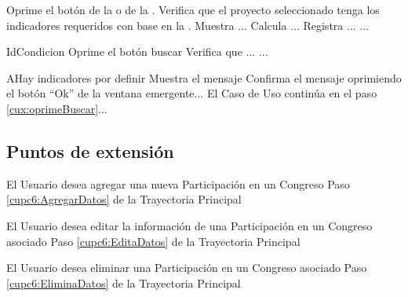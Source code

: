  \begin{UCtrayectoria}
    \UCpaso[\UCactor] Oprime el botón  de la  o de la .
    \label{cux:oprimeBuscar}
    \UCpaso[\UCsist] Verifica que el proyecto seleccionado tenga los indicadores requeridos con base en la  .
    \UCpaso Muestra  ...
    \UCpaso Calcula ...
    \UCpaso Registra ...
    ...
 \end{UCtrayectoria}
 
 \begin{UCtrayectoriaA}{Id}{Condicion}
    \UCpaso[\UCactor] Oprime el botón buscar
    \UCpaso Verifica que  ...
    ...
 \end{UCtrayectoriaA}
 
 \begin{UCtrayectoriaA}{A}{Hay indicadores por definir}
    \UCpaso[\UCsist] Muestra el mensaje  
    \UCpaso[\UCactor] Confirma el mensaje oprimiendo el botón ``Ok'' de la ventana emergente...
    \UCpaso[] El Caso de Uso continúa en el paso \ref{cux:oprimeBuscar}...
 \end{UCtrayectoriaA}


\subsection{Puntos de extensión}

\UCExtensionPoint
{El Usuario desea agregar una  nueva Participación en un Congreso}
{ Paso \ref{cupc6:AgregarDatos} de la Trayectoria Principal}
{}

\UCExtensionPoint
{El Usuario desea editar la información de una Participación en un Congreso asociado}
{ Paso \ref{cupc6:EditaDatos} de la Trayectoria Principal}
{}

\UCExtensionPoint
{El Usuario desea eliminar una Participación en un Congreso asociado}
{ Paso \ref{cupc6:EliminaDatos} de la Trayectoria Principal}
{}
